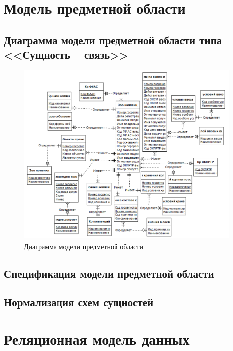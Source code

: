 \documentclass[10pt, a4paper, titlepage]{article}
\begin{document}
\section{Модель предметной области}

\subsection{Диаграмма модели предметной области типа <<Сущность -- связь>>}

\begin{figure}[H]
    \centering
    \includegraphics[height=9cm]{image.png}
    \caption{Диаграмма модели предметной области}
    \label{fig:er_diagram}
\end{figure}








\subsection{Спецификация модели предметной области}







\subsection{Нормализация схем сущностей}






\section{Реляционная модель данных}
\end{document}
